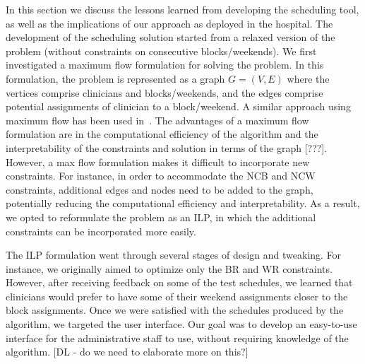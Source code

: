 In this section we discuss the lessons learned from developing the scheduling tool,
as well as the implications of our approach as deployed in the hospital.
The development of the scheduling solution started from a relaxed version of the problem
(without constraints on consecutive blocks/weekends).
We first investigated a maximum flow formulation for solving the problem.
In this formulation, the problem is represented as a graph $G=(V, E)$ where
the vertices comprise clinicians and blocks/weekends, and the edges comprise
potential assignments of clinician to a block/weekend.
A similar approach using maximum flow has been used in~\cite{brucker_personnel_2011, smet_polynomially_2016, el_adoly_new_2018, moz_integer_2003}.
The advantages of a maximum flow formulation are in the computational efficiency
of the algorithm and the interpretability of the constraints and solution in terms of the graph [???].
However, a max flow formulation makes it difficult to incorporate new constraints.
For instance, in order to accommodate the NCB and NCW constraints,
additional edges and nodes need to be added to the graph, potentially reducing 
the computational efficiency and interpretability.
As a result, we opted to reformulate the problem as an ILP, in which the additional constraints
can be incorporated more easily.

The ILP formulation went through several stages of design and tweaking.
For instance, we originally aimed to optimize only the BR and WR constraints.
However, after receiving feedback on some of the test schedules, we learned that 
clinicians would prefer to have some of their weekend assignments closer to the block assignments.
Once we were satisfied with the schedules produced by the algorithm, we targeted the
user interface. Our goal was to develop an easy-to-use interface for the administrative staff to use,
without requiring knowledge of the algorithm. [DL - do we need to elaborate more on this?]


